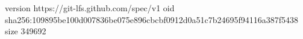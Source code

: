 version https://git-lfs.github.com/spec/v1
oid sha256:109895be100d007836be075e896cbcbf0912d0a51c7b24695f94116a387f5438
size 349692
